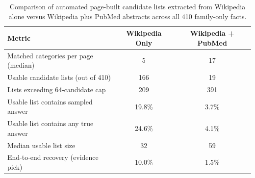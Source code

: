 \begin{table}[h]
\centering
\small
\setlength{\tabcolsep}{3pt}
\begin{tabular}{lcc}
\toprule
Metric & Wikipedia Only & Wikipedia + PubMed \\
\midrule
Matched categories per page (median) & 5 & 17 \\
Usable candidate lists (out of 410) & 166 & 19 \\
Lists exceeding 64-candidate cap & 209 & 391 \\
Usable list contains sampled answer & 19.8\% & 3.7\% \\
Usable list contains any true answer & 24.6\% & 4.1\% \\
Median usable list size & 32 & 59 \\
End-to-end recovery (evidence pick) & 10.0\% & 1.5\% \\
\bottomrule
\end{tabular}
\caption{Comparison of automated page-built candidate lists extracted from Wikipedia alone versus Wikipedia plus PubMed abstracts across all 410 family-only facts.}
\label{tab:pagebuilt}
\end{table}